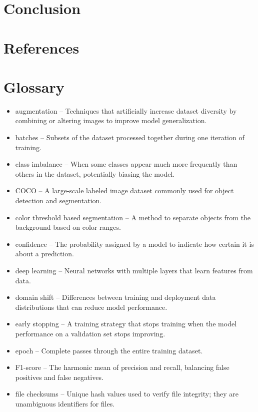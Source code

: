 \documentclass[12pt,a4paper]{article}
\begin{document}
\section{Conclusion}



\section{References}
\printbibliography[heading=none]

\section{Glossary}


\begin{itemize}
    \item augmentation – Techniques that artificially increase dataset diversity by combining or altering images to improve model generalization.
    \item batches – Subsets of the dataset processed together during one iteration of training.
    \item class imbalance – When some classes appear much more frequently than others in the dataset, potentially biasing the model.
    \item COCO – A large-scale labeled image dataset commonly used for object detection and segmentation.
    \item color threshold based segmentation – A method to separate objects from the background based on color ranges.
    \item confidence – The probability assigned by a model to indicate how certain it is about a prediction.
    \item deep learning – Neural networks with multiple layers that learn features from data.
    \item domain shift – Differences between training and deployment data distributions that can reduce model performance.
    \item early stopping – A training strategy that stops training when the model performance on a validation set stops improving.
    \item epoch – Complete passes through the entire training dataset.
    \item F1-score – The harmonic mean of precision and recall, balancing false positives and false negatives.
    \item file checksums – Unique hash values used to verify file integrity; they are unambiguous identifiers for files.

\end{itemize}
\end{document}
